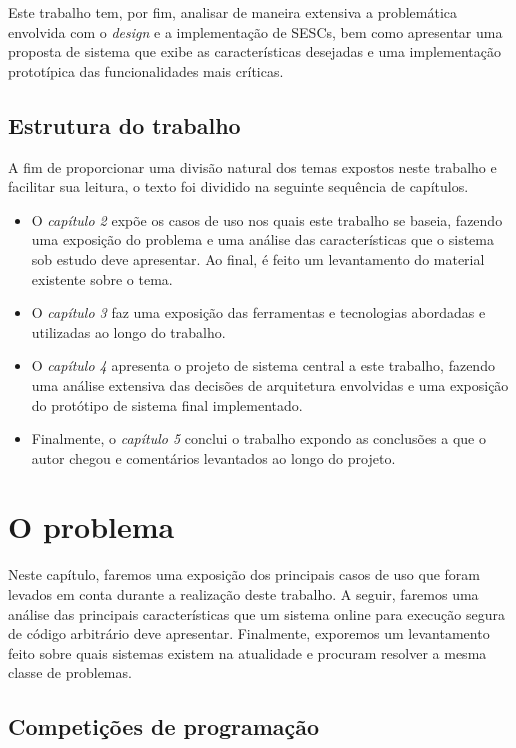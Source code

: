 \documentclass[ruledheader, 12pt]{abnt}
\begin{document}
Este trabalho tem, por fim, analisar de maneira extensiva a problemática envolvida com o \emph{design} e a implementação de SESCs, bem como apresentar uma proposta de sistema que exibe as características desejadas e uma implementação prototípica das funcionalidades mais críticas.

\section{Estrutura do trabalho}

A fim de proporcionar uma divisão natural dos temas expostos neste trabalho e facilitar sua leitura, o texto foi dividido na seguinte sequência de capítulos.
\begin{itemize}
	\item O \emph{capítulo 2} expõe os casos de uso nos quais este trabalho se baseia, fazendo uma exposição do problema e uma análise das características que o sistema sob estudo deve apresentar. Ao final, é feito um levantamento do material existente sobre o tema.
	\item O \emph{capítulo 3} faz uma exposição das ferramentas e tecnologias abordadas e utilizadas ao longo do trabalho.
	\item O \emph{capítulo 4} apresenta o projeto de sistema central a este trabalho, fazendo uma análise extensiva das decisões de arquitetura envolvidas e uma exposição do protótipo de sistema final implementado.
	\item Finalmente, o \emph{capítulo 5} conclui o trabalho expondo as conclusões a que o autor chegou e comentários levantados ao longo do projeto.
\end{itemize}

\chapter{O problema}

Neste capítulo, faremos uma exposição dos principais casos de uso que foram levados em conta durante a realização deste trabalho. A seguir, faremos uma análise das principais características que um sistema online para execução segura de código arbitrário deve apresentar. Finalmente, exporemos um levantamento feito sobre quais sistemas existem na atualidade e procuram resolver a mesma classe de problemas.

\section{Competições de programação}
\end{document}

